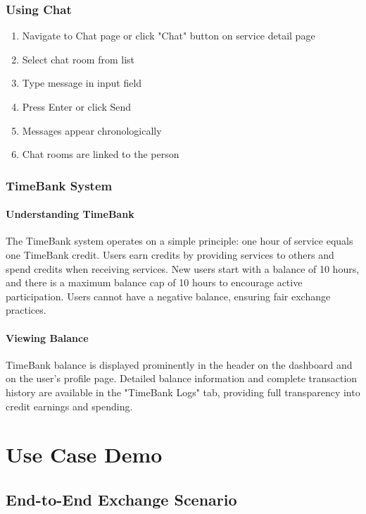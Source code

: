 \documentclass[12pt,a4paper]{report}
\begin{document}
\subsection{Using Chat}

\begin{enumerate}
    \item Navigate to Chat page or click "Chat" button on service detail page
    \item Select chat room from list
    \item Type message in input field
    \item Press Enter or click Send
    \item Messages appear chronologically
    \item Chat rooms are linked to the person
\end{enumerate}

\subsection{TimeBank System}

\subsubsection{Understanding TimeBank}

The TimeBank system operates on a simple principle: one hour of service equals one TimeBank credit. Users earn credits by providing services to others and spend credits when receiving services. New users start with a balance of 10 hours, and there is a maximum balance cap of 10 hours to encourage active participation. Users cannot have a negative balance, ensuring fair exchange practices.

\subsubsection{Viewing Balance}

TimeBank balance is displayed prominently in the header on the dashboard and on the user's profile page. Detailed balance information and complete transaction history are available in the "TimeBank Logs" tab, providing full transparency into credit earnings and spending.


\chapter{Use Case Demo}
\label{chap:usecase}

\section{End-to-End Exchange Scenario}
\end{document}
